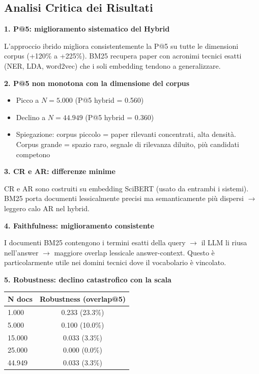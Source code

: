 \documentclass[12pt,a4paper]{article}
\begin{document}
\subsection{Analisi Critica dei Risultati}

\textbf{1. P@5: miglioramento sistematico del Hybrid}

L'approccio ibrido migliora consistentemente la P@5 su tutte le dimensioni corpus (+120\% a +225\%). BM25 recupera paper con acronimi tecnici esatti (NER, LDA, word2vec) che i soli embedding tendono a generalizzare.

\textbf{2. P@5 non monotona con la dimensione del corpus}
\begin{itemize}
  \item Picco a $N=5.000$ (P@5 hybrid = 0.560)
  \item Declino a $N=44.949$ (P@5 hybrid = 0.360)
  \item Spiegazione: corpus piccolo = paper rilevanti concentrati, alta densit\`a. Corpus grande = spazio raro, segnale di rilevanza diluito, pi\`u candidati competono
\end{itemize}

\textbf{3. CR e AR: differenze minime}

CR e AR sono costruiti su embedding SciBERT (usato da entrambi i sistemi). BM25 porta documenti lessicalmente precisi ma semanticamente pi\`u dispersi $\to$ leggero calo AR nel hybrid.

\textbf{4. Faithfulness: miglioramento consistente}

I documenti BM25 contengono i termini esatti della query $\to$ il LLM li riusa nell'answer $\to$ maggiore overlap lessicale answer-context. Questo \`e particolarmente utile nei domini tecnici dove il vocabolario \`e vincolato.

\textbf{5. Robustness: declino catastrofico con la scala}

\begin{center}
\begin{tabular}{lc}
\toprule
\textbf{N docs} & \textbf{Robustness (overlap@5)} \\
\midrule
1.000   & 0.233 (23.3\%) \\
5.000   & 0.100 (10.0\%) \\
15.000  & 0.033 (3.3\%) \\
25.000  & 0.000 (0.0\%) \\
44.949  & 0.033 (3.3\%) \\
\bottomrule
\end{tabular}
\end{center}
\end{document}
